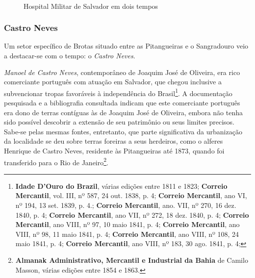 \begin{figure}[!htp]
\centering
{}
\  %
\caption{Hospital Militar de Salvador em dois tempos}
\label{fig:hospmil}
\end{figure}

\subsubsection{Castro Neves}\label{subsubsec:castroneves}

Um setor específico de Brotas situado entre as Pitangueiras e o Sangradouro veio a destacar-se com o tempo: o \textit{Castro Neves}.

\textit{Manoel de Castro Neves}, contemporâneo de Joaquim José de Oliveira, era rico comerciante português com atuação em Salvador, que chegou inclusive a subvencionar tropas favoráveis à independência do Brasil\footnote{\textbf{Idade D'Ouro do Brazil}, várias edições entre 1811 e 1823; \textbf{Correio Mercantil}, vol. III, nº 587, 24 out. 1838, p. 4; \textbf{Correio Mercantil}, ano VI, nº 194, 13 set. 1839, p. 4.; \textbf{Correio Mercantil}, ano. VII, nº 270, 16 dez. 1840, p. 4; \textbf{Correio Mercantil}, ano VII, nº 272, 18 dez. 1840, p. 4; \textbf{Correio Mercantil}, ano VIII, nº 97, 10 maio 1841, p. 4; \textbf{Correio Mercantil}, ano VIII, nº 98, 11 maio 1841, p. 4;  \textbf{Correio Mercantil}, ano VIII, nº 108, 24 maio 1841, p. 4; \textbf{Correio Mercantil}, ano VIII, nº 183, 30 ago. 1841, p. 4;}. A documentação pesquisada e a bibliografia consultada indicam que este comerciante português era dono de terras contíguas às de Joaquim José de Oliveira, embora não tenha sido possível descobrir a extensão de seu patrimônio ou seus limites precisos. Sabe-se pelas mesmas fontes, entretanto, que parte significativa da urbanização da localidade se deu sobre terras foreiras a seus herdeiros, como o alferes Henrique de Castro Neves, residente às Pitangueiras até 1873, quando foi transferido para o Rio de Janeiro\footnote{\textbf{Almanak Administrativo, Mercantil e Industrial da Bahia} de Camilo Masson, várias edições entre 1854 e 1863.}. 

